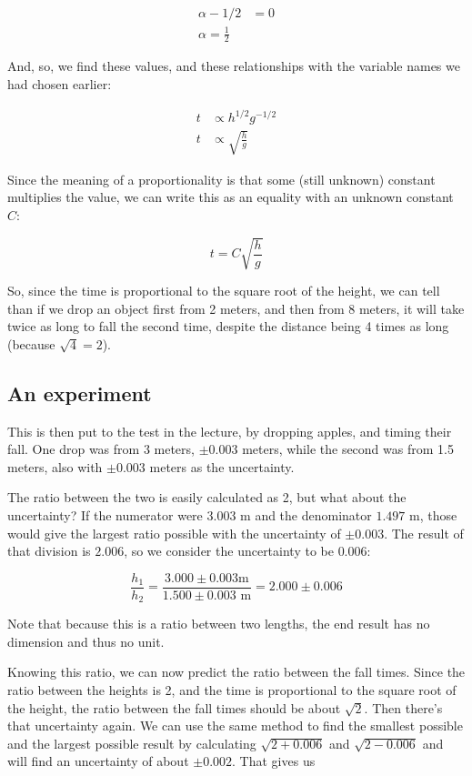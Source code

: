 \documentclass[8.01x]{subfiles}
\begin{document}
\begin{align*}
\alpha - 1/2 &= 0\\
\alpha = \frac{1}{2}
\end{align*}

And, so, we find these values, and these relationships with the variable names we had chosen earlier:

\begin{align}
t &\propto h^{1/2} g^{-1/2} \\
t &\propto \sqrt{\frac{h}{g}}
\end{align}

Since the meaning of a proportionality is that some (still unknown) constant multiplies the value, we can write this as an equality with an unknown constant $C$:

\begin{equation}
 t = C \sqrt{\frac{h}{g}}
\end{equation}

So, since the time is proportional to the square root of the height, we can tell than if we drop an object first from 2 meters, and then from 8 meters, it will take twice as long to fall the second time, despite the distance being 4 times as long (because $\sqrt{4} = 2$).

\subsection{An experiment}

This is then put to the test in the lecture, by dropping apples, and timing their fall. One drop was from 3 meters, $\pm 0.003$ meters, while the second was from 1.5 meters, also with $\pm 0.003$ meters as the uncertainty.

The ratio between the two is easily calculated as 2, but what about the uncertainty? If the numerator were $3.003$ m and the denominator $1.497$ m, those would give the largest ratio possible with the uncertainty of $\pm 0.003$. The result of that division is $2.006$, so we consider the uncertainty to be $0.006$:

\begin{equation}
 \frac{h_1}{h_2} = \frac{3.000 \pm 0.003 \text {m}}{1.500 \pm 0.003 \text{ m}} = 2.000 \pm 0.006
\end{equation}

Note that because this is a ratio between two lengths, the end result has no dimension and thus no unit.

Knowing this ratio, we can now predict the ratio between the fall times. Since the ratio between the heights is 2, and the time is proportional to the square root of the height, the ratio between the fall times should be about $\sqrt{2}$. Then there's that uncertainty again. We can use the same method to find the smallest possible and the largest possible result by calculating $\sqrt{2+0.006}$ and $\sqrt{2-0.006}$ and will find an uncertainty of about $\pm 0.002$. That gives us
\end{document}
